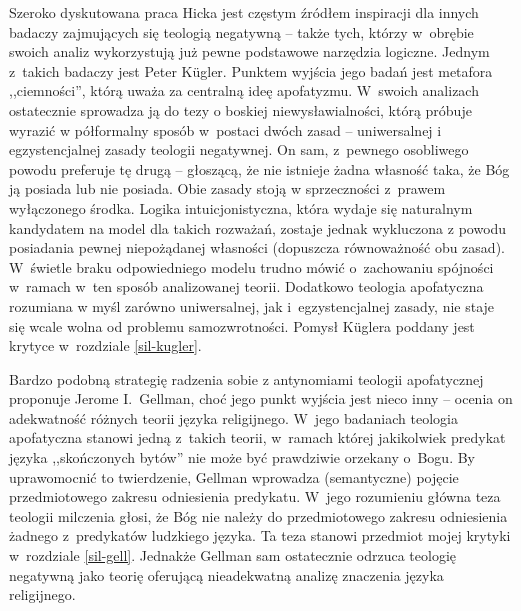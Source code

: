 Szeroko dyskutowana praca Hicka jest częstym źródłem inspiracji dla innych badaczy zajmujących się teologią negatywną -- także tych, którzy w~obrębie swoich analiz wykorzystują już pewne podstawowe narzędzia logiczne. Jednym z~takich badaczy jest Peter Kügler.
Punktem wyjścia jego badań jest metafora ,,ciemności'', którą uważa za centralną ideę apofatyzmu. W~swoich analizach ostatecznie sprowadza ją do tezy o boskiej niewysławialności, którą próbuje wyrazić w półformalny sposób w~postaci dwóch zasad -- uniwersalnej i egzystencjalnej zasady teologii negatywnej. On sam, z~pewnego osobliwego powodu preferuje tę drugą -- głoszącą, że nie istnieje żadna własność
taka, że Bóg ją posiada lub nie posiada.
Obie zasady stoją w sprzeczności z~prawem wyłączonego środka. Logika intuicjonistyczna, która wydaje się naturalnym kandydatem na model dla takich rozważań, zostaje jednak wykluczona z powodu posiadania pewnej niepożądanej własności (dopuszcza równoważność obu zasad). W~świetle braku odpowiedniego modelu trudno mówić o~zachowaniu spójności w~ramach w~ten sposób analizowanej teorii. Dodatkowo teologia apofatyczna rozumiana w myśl zarówno uniwersalnej, jak i~egzystencjalnej zasady, nie staje się wcale wolna od problemu samozwrotności.
Pomysł Küglera poddany jest krytyce w~rozdziale \ref{sil-kugler}.

Bardzo podobną strategię radzenia sobie z antynomiami teologii apofatycznej proponuje Jerome I.~Gellman, choć jego punkt wyjścia jest nieco inny -- 
ocenia on adekwatność różnych teorii języka religijnego. W~jego badaniach teologia apofatyczna stanowi jedną z~takich teorii, w~ramach której jakikolwiek predykat języka ,,skończonych bytów'' nie może być prawdziwie orzekany o~Bogu. By uprawomocnić to twierdzenie, Gellman wprowadza (semantyczne) pojęcie przedmiotowego zakresu odniesienia predykatu. W~jego rozumieniu główna teza teologii milczenia głosi, że Bóg nie należy do przedmiotowego zakresu odniesienia żadnego z~predykatów ludzkiego języka. Ta teza stanowi przedmiot mojej krytyki w~rozdziale \ref{sil-gell}. Jednakże Gellman sam ostatecznie odrzuca teologię negatywną jako teorię oferującą nieadekwatną analizę znaczenia języka religijnego.

